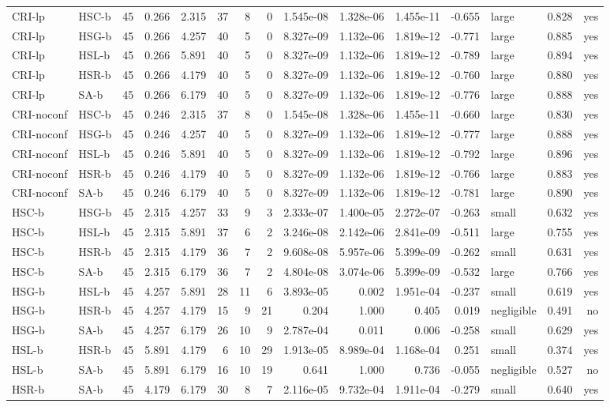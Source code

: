 \begin{table}[htbp]
\begin{tabular}{llrrrrrrrrrrlrr}
CRI-lp & HSC-b & 45 & 0.266 & 2.315 & 37 & 8 & 0 & 1.545e-08 & 1.328e-06 & 1.455e-11 & -0.655 & large & 0.828 & yes \\
CRI-lp & HSG-b & 45 & 0.266 & 4.257 & 40 & 5 & 0 & 8.327e-09 & 1.132e-06 & 1.819e-12 & -0.771 & large & 0.885 & yes \\
CRI-lp & HSL-b & 45 & 0.266 & 5.891 & 40 & 5 & 0 & 8.327e-09 & 1.132e-06 & 1.819e-12 & -0.789 & large & 0.894 & yes \\
CRI-lp & HSR-b & 45 & 0.266 & 4.179 & 40 & 5 & 0 & 8.327e-09 & 1.132e-06 & 1.819e-12 & -0.760 & large & 0.880 & yes \\
CRI-lp & SA-b & 45 & 0.266 & 6.179 & 40 & 5 & 0 & 8.327e-09 & 1.132e-06 & 1.819e-12 & -0.776 & large & 0.888 & yes \\
CRI-noconf & HSC-b & 45 & 0.246 & 2.315 & 37 & 8 & 0 & 1.545e-08 & 1.328e-06 & 1.455e-11 & -0.660 & large & 0.830 & yes \\
CRI-noconf & HSG-b & 45 & 0.246 & 4.257 & 40 & 5 & 0 & 8.327e-09 & 1.132e-06 & 1.819e-12 & -0.777 & large & 0.888 & yes \\
CRI-noconf & HSL-b & 45 & 0.246 & 5.891 & 40 & 5 & 0 & 8.327e-09 & 1.132e-06 & 1.819e-12 & -0.792 & large & 0.896 & yes \\
CRI-noconf & HSR-b & 45 & 0.246 & 4.179 & 40 & 5 & 0 & 8.327e-09 & 1.132e-06 & 1.819e-12 & -0.766 & large & 0.883 & yes \\
CRI-noconf & SA-b & 45 & 0.246 & 6.179 & 40 & 5 & 0 & 8.327e-09 & 1.132e-06 & 1.819e-12 & -0.781 & large & 0.890 & yes \\
HSC-b & HSG-b & 45 & 2.315 & 4.257 & 33 & 9 & 3 & 2.333e-07 & 1.400e-05 & 2.272e-07 & -0.263 & small & 0.632 & yes \\
HSC-b & HSL-b & 45 & 2.315 & 5.891 & 37 & 6 & 2 & 3.246e-08 & 2.142e-06 & 2.841e-09 & -0.511 & large & 0.755 & yes \\
HSC-b & HSR-b & 45 & 2.315 & 4.179 & 36 & 7 & 2 & 9.608e-08 & 5.957e-06 & 5.399e-09 & -0.262 & small & 0.631 & yes \\
HSC-b & SA-b & 45 & 2.315 & 6.179 & 36 & 7 & 2 & 4.804e-08 & 3.074e-06 & 5.399e-09 & -0.532 & large & 0.766 & yes \\
HSG-b & HSL-b & 45 & 4.257 & 5.891 & 28 & 11 & 6 & 3.893e-05 & 0.002 & 1.951e-04 & -0.237 & small & 0.619 & yes \\
HSG-b & HSR-b & 45 & 4.257 & 4.179 & 15 & 9 & 21 & 0.204 & 1.000 & 0.405 & 0.019 & negligible & 0.491 & no \\
HSG-b & SA-b & 45 & 4.257 & 6.179 & 26 & 10 & 9 & 2.787e-04 & 0.011 & 0.006 & -0.258 & small & 0.629 & yes \\
HSL-b & HSR-b & 45 & 5.891 & 4.179 & 6 & 10 & 29 & 1.913e-05 & 8.989e-04 & 1.168e-04 & 0.251 & small & 0.374 & yes \\
HSL-b & SA-b & 45 & 5.891 & 6.179 & 16 & 10 & 19 & 0.641 & 1.000 & 0.736 & -0.055 & negligible & 0.527 & no \\
HSR-b & SA-b & 45 & 4.179 & 6.179 & 30 & 8 & 7 & 2.116e-05 & 9.732e-04 & 1.911e-04 & -0.279 & small & 0.640 & yes \\
\bottomrule
\end{tabular}
\end{table}
